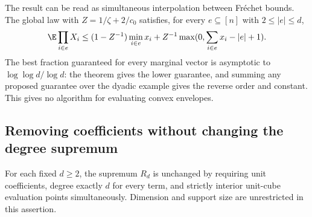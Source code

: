 The result can be read as simultaneous interpolation between Fr\'echet
bounds. The global law with $Z=1/\zeta+2/c_0$ satisfies, for every
$e\subseteq[n]$ with $2\le|e|\le d$,
\begin{equation}\label{eq:simultaneous-frechet}
 \E\prod_{i\in e}X_i\le(1-Z^{-1})\min_{i\in e}x_i
       +Z^{-1}\max(0,\sum_{i\in e}x_i-|e|+1).
\end{equation}
The best fraction guaranteed for every marginal vector is asymptotic to
$\log\log d/\log d$: the theorem gives the lower guarantee, and summing
any proposed guarantee over the dyadic example gives the reverse order
and constant. This gives no algorithm for evaluating convex envelopes.

\subsection{Removing coefficients without changing the degree supremum}
\begin{theorem}
\label{thm:coefficient-removal}
For each fixed $d\ge2$, the supremum $R_d$ is unchanged by requiring
unit coefficients, degree exactly $d$ for every term, and strictly interior
unit-cube evaluation points simultaneously. Dimension and support size
are unrestricted in this assertion.
\end{theorem}
